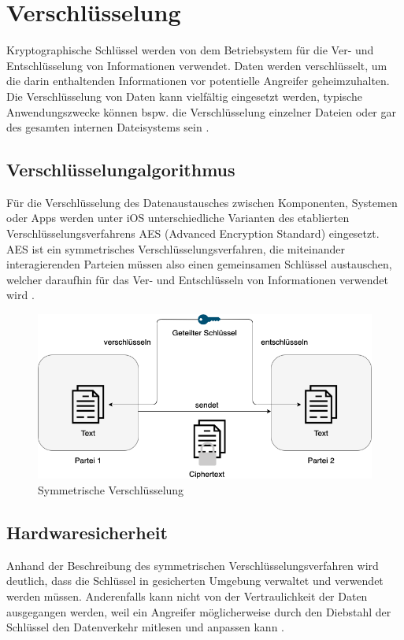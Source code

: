 \section{Verschlüsselung}
Kryptographische Schlüssel werden von dem Betriebsystem für die Ver- und Entschlüsselung von 
Informationen verwendet. Daten werden verschlüsselt, um die darin enthaltenden Informationen 
vor potentielle Angreifer geheimzuhalten. Die Verschlüsselung von Daten kann vielfältig eingesetzt 
werden, typische Anwendungszwecke können bspw. die Verschlüsselung einzelner Dateien oder gar 
des gesamten internen Dateisystems sein \cite{apple2020}.


\subsection{Verschlüsselungalgorithmus}
Für die Verschlüsselung des Datenaustausches zwischen Komponenten, Systemen oder Apps
werden unter iOS unterschiedliche Varianten des etablierten Verschlüsselungsverfahrens
AES (Advanced Encryption Standard) eingesetzt. AES ist ein symmetrisches Verschlüsselungsverfahren,
die miteinander interagierenden Parteien müssen also einen gemeinsamen Schlüssel austauschen, welcher
daraufhin für das Ver- und Entschlüsseln von Informationen verwendet wird
\cite{symmetricenc,apple2020}.

	\begin{figure}[h]
		\centering
		\includegraphics[width=135mm]{images/symmetric.png}
		\caption{Symmetrische Verschlüsselung \cite{symmetricenc}}
		\label{fig:symmetric}
	\end{figure}

\pagebreak

\subsection{Hardwaresicherheit}
Anhand der Beschreibung des symmetrischen Verschlüsselungsverfahren wird deutlich, dass die Schlüssel in
gesicherten Umgebung verwaltet und verwendet werden müssen. Anderenfalls kann nicht von der Vertraulichkeit 
der Daten ausgegangen werden, weil ein Angreifer möglicherweise durch den Diebstahl der Schlüssel den Datenverkehr
mitlesen und anpassen kann \cite{apple2020}.

